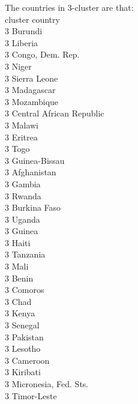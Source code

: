 \documentclass[12pt]{article}
\begin{document}
\begin{itemize}
\begin{enumerate}
      The countries in 3-cluster are that: \\
      cluster               country\\
      3                     Burundi\\
      3                     Liberia\\
      3            Congo, Dem. Rep.\\
      3                       Niger\\
      3                Sierra Leone\\
      3                  Madagascar\\
      3                  Mozambique\\
      3    Central African Republic\\
      3                      Malawi\\
      3                     Eritrea\\
      3                        Togo\\
      3               Guinea-Bissau\\
      3                 Afghanistan\\
      3                      Gambia\\
      3                      Rwanda\\
      3                Burkina Faso\\
      3                      Uganda\\
      3                      Guinea\\
      3                       Haiti\\
      3                    Tanzania\\
      3                        Mali\\
      3                       Benin\\
      3                     Comoros\\
      3                        Chad\\
      3                       Kenya\\
      3                     Senegal\\
      3                    Pakistan\\
      3                     Lesotho\\
      3                    Cameroon\\
      3                    Kiribati\\
      3       Micronesia, Fed. Sts.\\
      3                 Timor-Leste\\


\end{enumerate}
\end{itemize}
\end{document}
